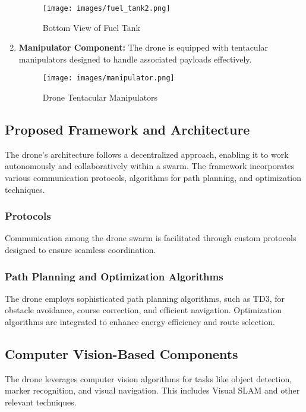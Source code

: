 \documentclass[preprint,12pt]{elsarticle}
\begin{document}
\begin{enumerate}
    \begin{figure}[!htbp]
    \centering
    \vspace{-1cm}
    \texttt{[image: images/fuel\_tank2.png]}
    \caption{Bottom View of Fuel Tank}
    \end{figure}

    \item \textbf{Manipulator Component:} The drone is equipped with tentacular manipulators designed to handle associated payloads effectively.

    \begin{figure}[!htbp]
    \centering

    \texttt{[image: images/manipulator.png]}
    \caption{Drone Tentacular Manipulators}
    \end{figure}
\end{enumerate}

\subsection{Proposed Framework and Architecture}
The drone's architecture follows a decentralized approach, enabling it to work autonomously and collaboratively within a swarm. The framework incorporates various communication protocols, algorithms for path planning, and optimization techniques.

\subsubsection{Protocols}
Communication among the drone swarm is facilitated through custom protocols designed to ensure seamless coordination.

\subsubsection{Path Planning and Optimization Algorithms}
The drone employs sophisticated path planning algorithms, such as TD3, for obstacle avoidance, course correction, and efficient navigation. Optimization algorithms are integrated to enhance energy efficiency and route selection.

\subsection{Computer Vision-Based Components}
The drone leverages computer vision algorithms for tasks like object detection, marker recognition, and visual navigation. This includes Visual SLAM and other relevant techniques.
\end{document}
